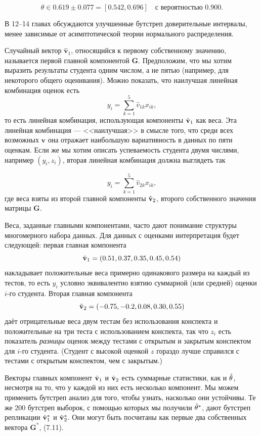 $$
\theta \in 0.619 \pm 0.077 = [ 0.542,0.696]\quad \text{с вероятностью }  0.900. 
$$

В 12--14 главах обсуждаются улучшенные бутстреп доверительные интервалы, менее зависимые от асимптотической теории нормального распределения.

Случайный вектор $\hat{\mathbf v}_1$, относящийся к первому собственному значению, называется первой главной компонентой $\mathbf G$. Предположим, что мы хотим выразить результаты студента одним числом, а не пятью (например, для некоторого общего оценивания). Можно показать, что наилучшая линейная комбинация оценок есть 
\begin{equation}
  y_i = \sum_{k=1}^5 \hat{v}_{1k} x_{ik},
\end{equation}
то есть линейная комбинация, использующая компоненты $\hat{\mathbf{v}}_1$ как веса. Эта линейная комбинация --- <<наилучшая>> в смысле того, что среди всех возможных $\mathbf v$ она отражает наибольшую вариативность в данных по пяти оценкам. Если же мы хотим описать успеваемость студента двумя числями, например $(y_i,z_i)$, вторая линейная комбинация должна выглядеть так

\begin{equation}
  y_i = \sum_{k=1}^5 \hat{v}_{2k} x_{ik},
\end{equation}
где веса взяты из второй главной компоненты $\hat{\mathbf{v}}_2$, второго собственного значения матрицы $\mathbf G$.

Веса, заданные главными компонентами, часто дают понимание структуры многомерного набора данных. Для данных с оценками интерпретация будет следующей: первая главная компонента $$\hat{\mathbf{v}}_1 = (0.51, 0.37, 0.35, 0.45, 0.54)$$ накладывает положительные веса примерно одинакового размера на каждый из тестов, то есть $y_i$ условно эквивалентно взятию суммарной (или средней) оценки $i$-го студента. Вторая главная компонента $$\hat{\mathbf{v}}_2 = (-0.75, -0.2, 0.08, 0.30, 0.55)$$ даёт отрицательные веса двум тестам без использования конспекта и положительные на три теста с использованием конспекта, так что $z_i$ есть показатель \textit{разницы} оценок между тестами с открытым и закрытым конспектом для $i$-го студента. (Студент с высокой оценкой $z$ гораздо лучше справился с тестами с открытым конспектом, чем с закрытым.)

Векторы главных компонент $\hat{\mathbf{v}}_1$ и $\hat{\mathbf{v}}_2$ есть суммарные статистики, как и $\hat \theta$, несмотря на то, что у каждой из них есть несколько компонент. Мы можем применить бутстреп анализ для того, чтобы узнать, насколько они устойчивы. Те же 200 бутстреп выборок, с помощью которых мы получили $\hat \theta^*$, дают бутстреп репликации $\hat{\mathbf{v}}_1^*$ и $\hat{\mathbf{v}}_2^*$. Они могут быть посчитаны как первые два собственных вектора $\mathbf G^*$, (7.11).

